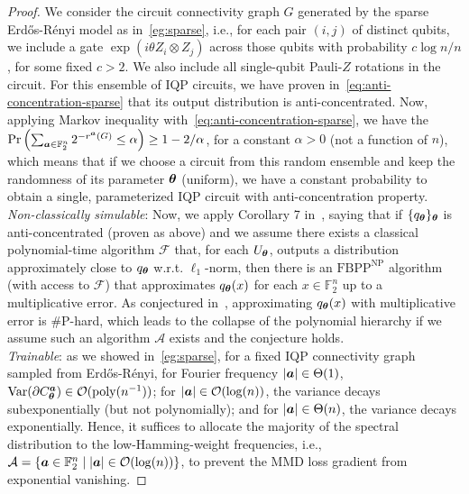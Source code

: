 \documentclass{article}
\theoremstyle{plain}
\theoremstyle{definition}
\theoremstyle{remark}
\begin{document}
\begin{proof}
    We consider the circuit connectivity graph $G$ generated by the sparse Erd\H os-R\'enyi model as in~\cref{eg:sparse}, i.e., for each pair $(i, j)$ of distinct qubits, we include a gate $\exp({i\theta Z_i\otimes Z_j})$ across those qubits with probability $c\log n/n$, for some fixed $c>2$. We also include all single-qubit Pauli-$Z$ rotations in the circuit. For this ensemble of IQP circuits, we have proven in~\cref{eq:anti-concentration-sparse} that its output distribution is anti-concentrated. Now, applying Markov inequality with~\cref{eq:anti-concentration-sparse}, we have the $\Pr\left(\sum_{{\bm{a}} \in \mathbb{F}_2^n}  2^{-r^{\bm{a}}(G)} \le \alpha\right) \ge 1 - 2/\alpha$, for a constant $\alpha >0$ (not a function of $n$), which means that if we choose a circuit from this random ensemble and keep the randomness of its parameter ${\bm{\theta}}$ (uniform), we have a constant probability to obtain a single, parameterized IQP circuit with anti-concentration property.  \\
    \emph{Non-classically simulable}: Now, we apply Corollary 7 in~\cite{Bremner17}, saying that if $\{q_{\bm{\theta}}\}_{\bm{\theta}}$ is anti-concentrated (proven as above) and we assume there exists a classical polynomial-time algorithm $\mathcal{F}$ that, for each $U_{\bm{\theta}}$, outputs a distribution approximately close to $q_{\bm{\theta}}$ w.r.t. $\ell_1$-norm, then there is an $\text{FBPP}^{\text{NP}}$ algorithm (with access to $\mathcal{F}$) that approximates $q_{\bm{\theta}}(x)$ for each $x\in\mathbb{F}_2^n$ up to a multiplicative error. As conjectured in~\cite{Bremner17}, approximating $q_{\bm{\theta}}(x)$ with multiplicative error is \#P-hard, which leads to the collapse of the polynomial hierarchy if we assume such an algorithm $\mathcal{A}$ exists and the conjecture holds.\\
    \emph{Trainable}: as we showed in~\cref{eg:sparse}, for a fixed IQP connectivity graph sampled from Erd\H{o}s-R\'enyi, for Fourier frequency $|{\bm{a}}|\in \Theta(1)$, $\operatorname{Var}(\partial C_{\bm{\theta}}^{\bm{a}}) \in \mathcal{O}(\mathrm{poly}(n^{-1}))$; for $|{\bm{a}}|\in \mathcal{O}(\log(n))$, the variance decays subexponentially (but not polynomially); and for $|{\bm{a}}|\in \Theta(n)$, the variance decays exponentially. Hence, it suffices to allocate the majority of the spectral distribution to the low-Hamming-weight frequencies, i.e., $\mathcal{A}=\{{\bm{a}}\in\mathbb{F}_2^n \;\vert\; |{\bm{a}}|\in \mathcal{O}(\log(n))\}$, to prevent the MMD loss gradient from exponential vanishing.
\end{proof}
\end{document}
